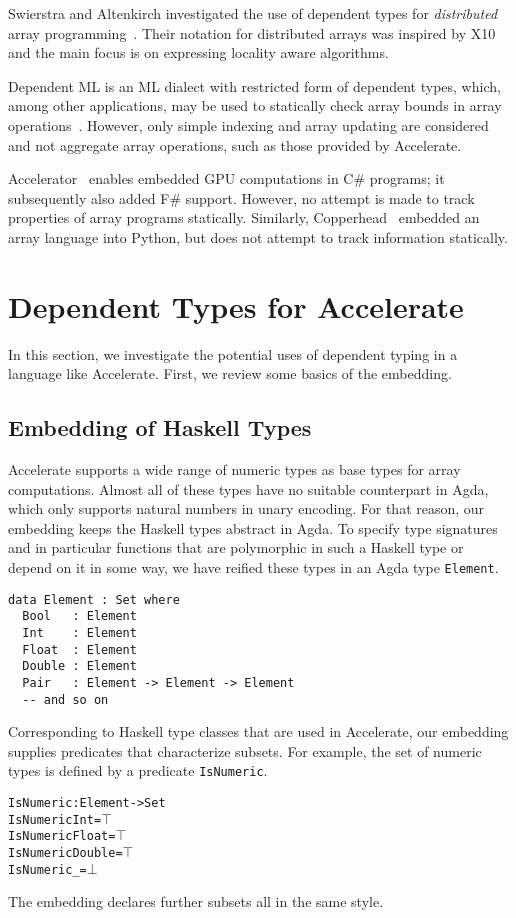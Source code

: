 \documentclass{llncs}
\begin{document}
Swierstra and Altenkirch investigated the use of dependent types for \emph{distributed} array programming~\cite{swierstra-altenkirch:dep-types-for-distr-arrays,swierstra:more-dependent-types}. Their notation for distributed arrays was inspired by X10 and the main focus is on expressing locality aware algorithms.

Dependent ML is an ML dialect with restricted form of dependent types, which, among other applications, may be used to statically check array bounds in array operations~\cite{xi:dml-jfp}. However, only simple indexing and array updating are considered and not aggregate array operations, such as those provided by Accelerate.

Accelerator~\cite{Tarditi:2006} enables embedded GPU computations in C\# programs; it subsequently also added F\# support. However, no attempt is made to track properties of array programs statically. Similarly, Copperhead~\cite{Catanzaro:EECS-2010-124} embedded an array language into Python, but does not attempt to track information statically.

\section{Dependent Types for Accelerate}
\label{sec:dependent-types}

In this section, we investigate the potential uses of dependent typing
in a language like Accelerate. First, we review some basics of the
embedding. 

\subsection{Embedding of Haskell Types}
\label{sec:embedding-types}

Accelerate supports a wide range of numeric types as base types for
array computations. Almost all of these types have no suitable
counterpart in Agda, which only supports natural numbers in unary
encoding. For that reason, our embedding keeps the Haskell types
abstract in Agda. To specify type signatures and in particular
functions that are polymorphic in such a Haskell type or depend on it
in some way, we have reified these types in an Agda type
\texttt{Element}.
\begin{verbatim}
data Element : Set where
  Bool   : Element
  Int    : Element
  Float  : Element
  Double : Element
  Pair   : Element -> Element -> Element
  -- and so on
\end{verbatim}
Corresponding to Haskell type classes that are used in Accelerate, our
embedding supplies predicates that characterize subsets. For example,
the set of numeric types is defined by a predicate \texttt{IsNumeric}.
\begin{alltt}
IsNumeric : Element -> Set
IsNumeric Int = \(\top\)
IsNumeric Float = \(\top\)
IsNumeric Double = \(\top\)
IsNumeric _ = \(\bot\)
\end{alltt}
The embedding declares further subsets all in the same style.
\end{document}
